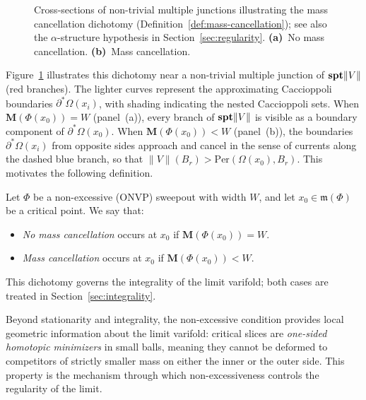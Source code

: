 \begin{figure}[ht]
    \caption{Cross-sections of non-trivial multiple junctions illustrating the mass cancellation dichotomy (Definition~\ref{def:mass-cancellation}); see also the $\alpha$-structure hypothesis in Section~\ref{sec:regularity}. \textbf{(a)}~No mass cancellation. \textbf{(b)}~Mass cancellation.}
    \label{fig:regularity-preview}
\end{figure}

Figure~\ref{fig:regularity-preview} illustrates this dichotomy near a non-trivial multiple junction of $\mathbf{spt}\|V\|$ (red branches). The lighter curves represent the approximating Caccioppoli boundaries $\partial^*\Omega(x_i)$, with shading indicating the nested Caccioppoli sets. When $\mathbf{M}(\Phi(x_0)) = W$ (panel~(a)), every branch of $\mathbf{spt}\|V\|$ is visible as a boundary component of $\partial^*\Omega(x_0)$. When $\mathbf{M}(\Phi(x_0)) < W$ (panel~(b)), the boundaries $\partial^*\Omega(x_i)$ from opposite sides approach and cancel in the sense of currents along the dashed blue branch, so that $\|V\|(B_r) > \mathrm{Per}(\Omega(x_0), B_r)$. This motivates the following definition.

\begin{definition}\label{def:mass-cancellation}
Let $\Phi$ be a non-excessive (ONVP) sweepout with width $W$, and let $x_0 \in \mathfrak{m}(\Phi)$ be a critical point. We say that:
\begin{itemize}
    \item \emph{No mass cancellation} occurs at $x_0$ if $\mathbf{M}(\Phi(x_0)) = W$.
    \item \emph{Mass cancellation} occurs at $x_0$ if $\mathbf{M}(\Phi(x_0)) < W$.
\end{itemize}
\end{definition}

This dichotomy governs the integrality of the limit varifold; both cases are treated in Section~\ref{sec:integrality}.

Beyond stationarity and integrality, the non-excessive condition provides local geometric information about the limit varifold: critical slices are \emph{one-sided homotopic minimizers} in small balls, meaning they cannot be deformed to competitors of strictly smaller mass on either the inner or the outer side. This property is the mechanism through which non-excessiveness controls the regularity of the limit.

